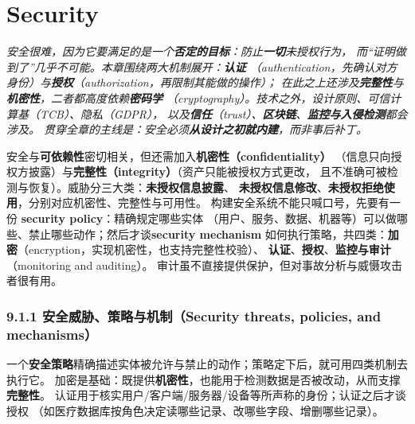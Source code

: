 \chapter{Security}
\begin{center}
\begin{minipage}{0.9\textwidth}
\itshape\small\color{dsgray}
安全很难，因为它要满足的是一个\textbf{否定的目标}：防止\textbf{一切}未授权行为，
而“证明做到了”几乎不可能。本章围绕两大机制展开：\textbf{认证}
（authentication，先确认对方身份）与\textbf{授权}（authorization，再限制其能做的操作）；
在此之上还涉及\textbf{完整性}与\textbf{机密性}，二者都高度依赖\textbf{密码学}
（cryptography）。技术之外，设计原则、可信计算基（TCB）、隐私（GDPR），
以及\textbf{信任}（trust）、\textbf{区块链}、\textbf{监控与入侵检测}都会涉及。
贯穿全章的主线是：安全必须\textbf{从设计之初就内建}，而非事后补丁。
\end{minipage}
\end{center}


安全与\textbf{可依赖性}密切相关，但还需加入\textbf{机密性（confidentiality）}
（信息只向授权方披露）与\textbf{完整性（integrity）}（资产只能被授权方式更改，
且不准确可被检测与恢复）。威胁分三大类：\textbf{未授权信息披露}、
\textbf{未授权信息修改}、\textbf{未授权拒绝使用}，分别对应机密性、完整性与可用性。
构建安全系统不能只喊口号，先要有一份 \textbf{security policy}：精确规定哪些实体
（用户、服务、数据、机器等）可以做哪些、禁止哪些动作；然后才谈\textbf{security mechanism}
如何执行策略，共四类：\textbf{加密}（encryption，实现机密性，也支持完整性校验）、
\textbf{认证}、\textbf{授权}、\textbf{监控与审计}（monitoring and auditing）。
审计虽不直接提供保护，但对事故分析与威慑攻击者很有用。

\subsection*{9.1.1 安全威胁、策略与机制（Security threats, policies, and mechanisms）}
一个\textbf{安全策略}精确描述实体被允许与禁止的动作；策略定下后，就可用四类机制去执行它。
加密是基础：既提供\textbf{机密性}，也能用于检测数据是否被改动，从而支撑\textbf{完整性}。
认证用于核实用户/客户端/服务器/设备等所声称的身份；认证之后才谈授权
（如医疗数据库按角色决定读哪些记录、改哪些字段、增删哪些记录）。

\begin{closeread}
\end{closeread}

